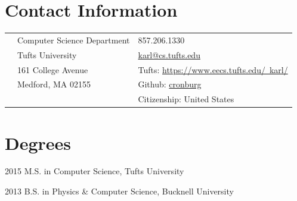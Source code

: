 \documentclass[margin,line]{res}                          %
\newenvironment{list1}{
  \begin{list}{\ding{113}}{%
      \setlength{\itemsep}{0in}
      \setlength{\parsep}{0in} \setlength{\parskip}{0in}
      \setlength{\topsep}{0in} \setlength{\partopsep}{0in}
      \setlength{\leftmargin}{0.17in}}}{\end{list}}
\begin{document}

\begin{resume}
\thispagestyle{plain} %

\section{\sc Contact Information}
\vspace{.05in}
\begin{tabular}{@{}p{0.20in}p{2.75in}p{2.75in}}
 & Computer Science Department  & 857.206.1330 \\
 & Tufts University             & \href{mailto:karl@cs.tufts.edu}{karl@cs.tufts.edu} \\
 & 161 College Avenue           & Tufts: \href{https://www.eecs.tufts.edu/~karl/}{https://www.eecs.tufts.edu/~karl/}\\
 & Medford, MA 02155            & Github: \href{https://github.com/cronburg/}{cronburg} \\
 &                              & Citizenship: United States \\
\end{tabular}



\section{\sc Degrees}
\begin{list1}
\item[] 2015 \hspace{0.25cm} M.S. in Computer Science, Tufts University
\item[] 2013 \hspace{0.25cm} B.S. in Physics \& Computer Science, Bucknell University
\end{list1}


\end{resume}
\end{document}
